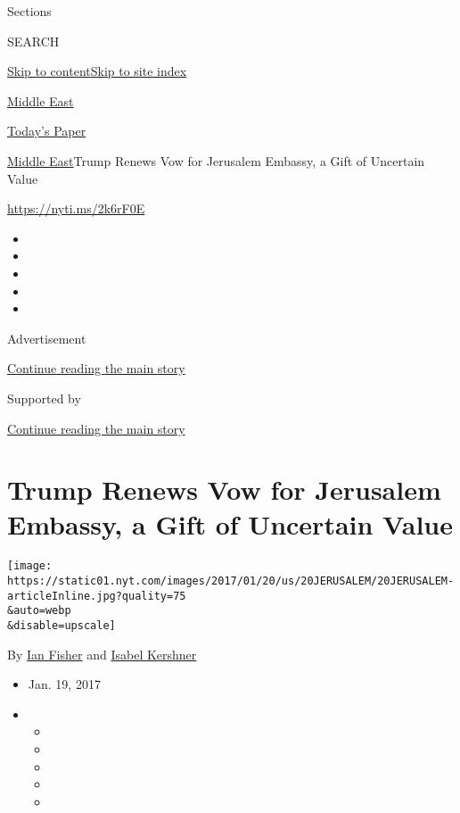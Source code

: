 Sections

SEARCH

\protect\hyperlink{site-content}{Skip to
content}\protect\hyperlink{site-index}{Skip to site index}

\href{https://www.nytimes.com/section/world/middleeast}{Middle East}

\href{https://myaccount.nytimes.com/auth/login?response_type=cookie\&client_id=vi}{}

\href{https://www.nytimes.com/section/todayspaper}{Today's Paper}

\href{/section/world/middleeast}{Middle East}\textbar{}Trump Renews Vow
for Jerusalem Embassy, a Gift of Uncertain Value

\url{https://nyti.ms/2k6rF0E}

\begin{itemize}
\item
\item
\item
\item
\item
\end{itemize}

Advertisement

\protect\hyperlink{after-top}{Continue reading the main story}

Supported by

\protect\hyperlink{after-sponsor}{Continue reading the main story}

\hypertarget{trump-renews-vow-for-jerusalem-embassy-a-gift-of-uncertain-value}{%
\section{Trump Renews Vow for Jerusalem Embassy, a Gift of Uncertain
Value}\label{trump-renews-vow-for-jerusalem-embassy-a-gift-of-uncertain-value}}

\texttt{[image: https://static01.nyt.com/images/2017/01/20/us/20JERUSALEM/20JERUSALEM-articleInline.jpg?quality=75\\\&auto=webp\\\&disable=upscale]}

By \href{http://www.nytimes.com/by/ian-fisher}{Ian Fisher} and
\href{https://www.nytimes.com/by/isabel-kershner}{Isabel Kershner}

\begin{itemize}
\item
  Jan. 19, 2017
\item
  \begin{itemize}
  \item
  \item
  \item
  \item
  \item
  \end{itemize}
\end{itemize}

